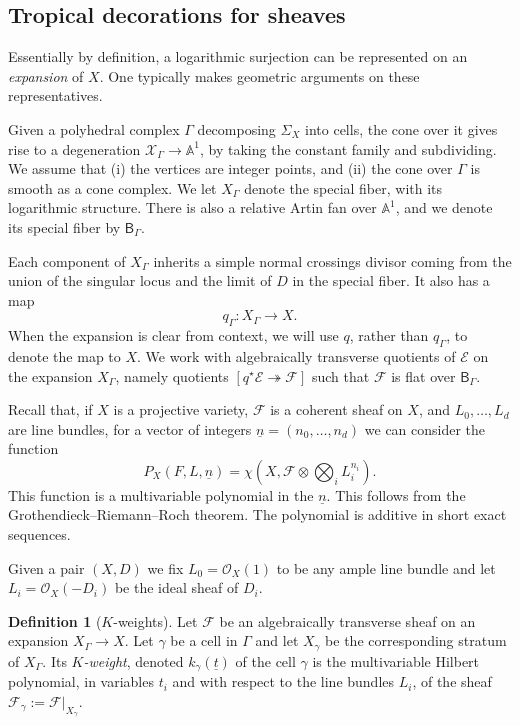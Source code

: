 \documentclass[11pt]{amsart}
\theoremstyle{definition}
\theoremstyle{definition}
\newtheorem{definition}[theorem]{Definition}
\newcommand{\A}{\mathbb{A}}
\begin{document}
\subsection{Tropical decorations for sheaves}\label{sec:TropDecorations} Essentially by definition, a logarithmic surjection can be represented on an {\it expansion} of $X$. One typically makes geometric arguments on these representatives.

Given a polyhedral complex $\Gamma$ decomposing $\Sigma_X$ into cells, the cone over it gives rise to a degeneration $\mathcal X_\Gamma\to \A^1$, by taking the constant family and subdividing. We assume that (i) the vertices are integer points, and (ii) the cone over $\Gamma$ is smooth as a cone complex.  We let $X_\Gamma$ denote the special fiber, with its logarithmic structure. There is also a relative Artin fan over $\A^1$, and we denote its special fiber by $\mathsf B_\Gamma$. 

Each component of $X_\Gamma$ inherits a simple normal crossings divisor coming from the union of the singular locus and the limit of $D$ in the special fiber. It also has a map
\[
q_\Gamma\colon X_\Gamma\to X.
\]
When the expansion is clear from context, we will use $q$, rather than $q_\Gamma$, to denote the map to $X$. We work with {algebraically transverse quotients of $\mathcal E$} on the expansion $X_\Gamma$, namely quotients $[q^\star\mathcal E\twoheadrightarrow \mathcal F]$ such that $\mathcal F$ is flat over $\mathsf B_\Gamma$. 

Recall that, if $X$ is a projective variety, $\mathcal F$ is a coherent sheaf on $X$, and $L_0,\ldots,L_d$ are line bundles, for a vector of integers $\underline n = (n_0,\ldots,n_d)$ we can consider the function
\[
P_X(F,L,\underline n) = \chi(X,\mathcal F\otimes\bigotimes_i L_i^{n_i}).
\]
This function is a multivariable polynomial in the $\underline n$. This follows from the Grothendieck--Riemann--Roch theorem. The polynomial is additive in short exact sequences. 

Given a pair $(X,D)$ we fix $L_0 = \mathcal O_X(1)$ to be any ample line bundle and let $L_i = \mathcal O_X(-D_i)$ be the ideal sheaf of $D_i$. 

\begin{definition}[$K$-weights]
Let $\mathcal F$ be an algebraically transverse sheaf on an expansion $X_\Gamma\to X$. Let $\gamma$ be a cell in $\Gamma$ and let $X_\gamma$ be the corresponding stratum of $X_\Gamma$. Its {\it $K$-weight}, denoted $k_\gamma(\underline t)$ of the cell $\gamma$ is the multivariable Hilbert polynomial, in variables $t_i$ and with respect to the line bundles $L_i$, of the sheaf $\mathcal F_\gamma:=\mathcal F|_{X_\gamma}$. 
\end{definition}
\end{document}

